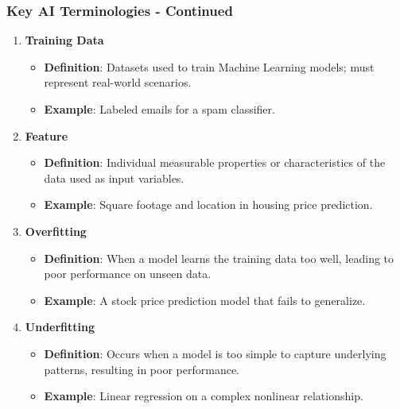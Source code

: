\documentclass[aspectratio=169]{beamer}
\begin{document}
\begin{frame}[fragile]
    \frametitle{Key AI Terminologies - Continued}
    \begin{enumerate}[resume]
        \item \textbf{Training Data}
        \begin{itemize}
            \item \textbf{Definition}: Datasets used to train Machine Learning models; must represent real-world scenarios.
            \item \textbf{Example}: Labeled emails for a spam classifier.
        \end{itemize}

        \item \textbf{Feature}
        \begin{itemize}
            \item \textbf{Definition}: Individual measurable properties or characteristics of the data used as input variables.
            \item \textbf{Example}: Square footage and location in housing price prediction.
        \end{itemize}

        \item \textbf{Overfitting}
        \begin{itemize}
            \item \textbf{Definition}: When a model learns the training data too well, leading to poor performance on unseen data.
            \item \textbf{Example}: A stock price prediction model that fails to generalize.
        \end{itemize}
        
        \item \textbf{Underfitting}
        \begin{itemize}
            \item \textbf{Definition}: Occurs when a model is too simple to capture underlying patterns, resulting in poor performance.
            \item \textbf{Example}: Linear regression on a complex nonlinear relationship.
        \end{itemize}
    \end{enumerate}
\end{frame}
\end{document}
